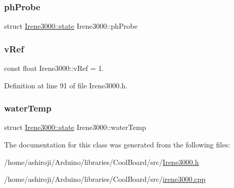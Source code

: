 \mbox{\label{class_irene3000_a997a4ee466fa1d5416e07e444965dc9e}} 
\subsubsection{\texorpdfstring{ph\+Probe}{phProbe}}
{\footnotesize\ttfamily struct \hyperlink{struct_irene3000_1_1state}{Irene3000\+::state}  Irene3000\+::ph\+Probe\hspace{0.3cm}{\ttfamily [private]}}

\mbox{\label{class_irene3000_a018e7ff9bee57e6d2b298667a668ba7e}} 
\subsubsection{\texorpdfstring{v\+Ref}{vRef}}
{\footnotesize\ttfamily const float Irene3000\+::v\+Ref = 1.\hspace{0.3cm}{\ttfamily [private]}}



Definition at line 91 of file Irene3000.\+h.

\mbox{\label{class_irene3000_af05612c78c758ce9db316c75ad937130}} 
\subsubsection{\texorpdfstring{water\+Temp}{waterTemp}}
{\footnotesize\ttfamily struct \hyperlink{struct_irene3000_1_1state}{Irene3000\+::state}  Irene3000\+::water\+Temp\hspace{0.3cm}{\ttfamily [private]}}



The documentation for this class was generated from the following files\+:\begin{DoxyCompactItemize}
\item 
/home/ashiroji/\+Arduino/libraries/\+Cool\+Board/src/\hyperlink{_irene3000_8h}{Irene3000.\+h}\item 
/home/ashiroji/\+Arduino/libraries/\+Cool\+Board/src/\hyperlink{irene3000_8cpp}{irene3000.\+cpp}\end{DoxyCompactItemize}
